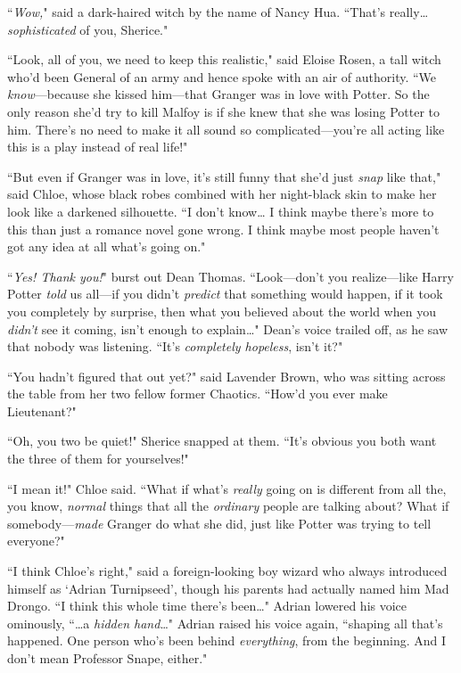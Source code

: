 ``\emph{Wow,}" said a dark-haired witch by the name of Nancy Hua. ``That's really{\ldots} \emph{sophisticated} of you, Sherice."

``Look, all of you, we need to keep this realistic," said Eloise Rosen, a tall witch who'd been General of an army and hence spoke with an air of authority. ``We \emph{know}—because she kissed him—that Granger was in love with Potter. So the only reason she'd try to kill Malfoy is if she knew that she was losing Potter to him. There's no need to make it all sound so complicated—you're all acting like this is a play instead of real life!"

``But even if Granger was in love, it's still funny that she'd just \emph{snap} like that," said Chloe, whose black robes combined with her night-black skin to make her look like a darkened silhouette. ``I don't know{\ldots} I think maybe there's more to this than just a romance novel gone wrong. I think maybe most people haven't got any idea at all what's going on."

``\emph{Yes! Thank you!}" burst out Dean Thomas. ``Look—don't you realize—like Harry Potter \emph{told} us all—if you didn't \emph{predict} that something would happen, if it took you completely by surprise, then what you believed about the world when you \emph{didn't} see it coming, isn't enough to explain{\ldots}" Dean's voice trailed off, as he saw that nobody was listening. ``It's \emph{completely hopeless}, isn't it?"

``You hadn't figured that out yet?" said Lavender Brown, who was sitting across the table from her two fellow former Chaotics. ``How'd you ever make Lieutenant?"

``Oh, you two be quiet!" Sherice snapped at them. ``It's obvious you both want the three of them for yourselves!"

``I mean it!" Chloe said. ``What if what's \emph{really} going on is different from all the, you know, \emph{normal} things that all the \emph{ordinary} people are talking about? What if somebody—\emph{made} Granger do what she did, just like Potter was trying to tell everyone?"

``I think Chloe's right," said a foreign-looking boy wizard who always introduced himself as `Adrian Turnipseed', though his parents had actually named him Mad Drongo. ``I think this whole time there's been{\ldots}" Adrian lowered his voice ominously, ``{\ldots}a \emph{hidden hand}{\ldots}" Adrian raised his voice again, ``shaping all that's happened. One person who's been behind \emph{everything}, from the beginning. And I don't mean Professor Snape, either."

